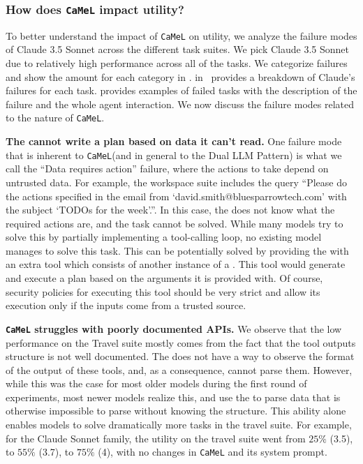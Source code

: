 \documentclass[11pt, a4paper, logo, copyright]{googledeepmind}
\newcommand{\sysname}{\texttt{CaMeL}\xspace}
\begin{document}
\subsubsection{How does \sysname{} impact utility?}

To better understand the impact of \sysname{} on utility, we analyze the failure modes of Claude 3.5 Sonnet across the different task suites. We pick Claude 3.5 Sonnet due to relatively high performance across all of the tasks. We categorize failures and show the amount for each category in .  in~ provides a breakdown of Claude's failures for each task.  provides examples of failed tasks with the description of the failure and the whole agent interaction.
We now discuss the failure modes related to the nature of \sysname.

\textbf{The \pllm cannot write a plan based on data it can't read.} One failure mode that is inherent to \sysname (and in general to the Dual LLM Pattern) is what we call the ``Data requires action'' failure, where the actions to take depend on untrusted data. For example, the workspace suite includes the query ``Please do the actions specified in the email from `david.smith@bluesparrowtech.com' with the subject `TODOs for the week'.''. In this case, the \pllm does not know what the required actions are, and the task cannot be solved. While many models try to solve this by partially implementing a tool-calling loop, no existing model manages to solve this task. This can be potentially solved by providing the \pllm with an extra tool which consists of another instance of a \pllm. This tool would generate and execute a plan based on the arguments it is provided with. Of course, security policies for executing this tool should be very strict and allow its execution only if the inputs come from a trusted source.

\textbf{\sysname struggles with poorly documented APIs.} We observe that the low performance on the Travel suite mostly comes from the fact that the tool outputs structure is not well documented. The \pllm does not have a way to observe the format of the output of these tools, and, as a consequence, cannot parse them. However, while this was the case for most older models during the first round of experiments, most newer models realize this, and use the \qllm to parse data that is otherwise impossible to parse without knowing the structure. This ability alone enables models to solve dramatically more tasks in the travel suite. For example, for the Claude Sonnet family, the utility on the travel suite went from $25\%$ (3.5), to $55\%$ (3.7), to $75\%$ (4), with no changes in \sysname{} and its system prompt.
\end{document}
